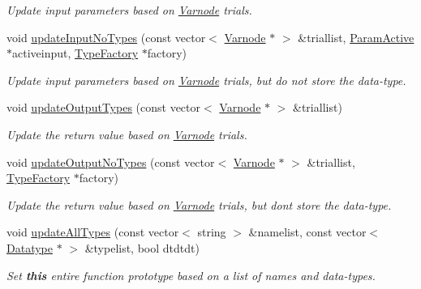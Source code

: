 \begin{DoxyCompactItemize}
\begin{DoxyCompactList}\small\item\em Update input parameters based on \mbox{\hyperlink{class_varnode}{Varnode}} trials. \end{DoxyCompactList}\item 
void \mbox{\hyperlink{class_func_proto_ad2b6986a4cf61f042579472e394ad7f8}{update\+Input\+No\+Types}} (const vector$<$ \mbox{\hyperlink{class_varnode}{Varnode}} $\ast$ $>$ \&triallist, \mbox{\hyperlink{class_param_active}{Param\+Active}} $\ast$activeinput, \mbox{\hyperlink{class_type_factory}{Type\+Factory}} $\ast$factory)
\begin{DoxyCompactList}\small\item\em Update input parameters based on \mbox{\hyperlink{class_varnode}{Varnode}} trials, but do not store the data-\/type. \end{DoxyCompactList}\item 
void \mbox{\hyperlink{class_func_proto_a56cbde2e23cdcf41ddb870721e02be6b}{update\+Output\+Types}} (const vector$<$ \mbox{\hyperlink{class_varnode}{Varnode}} $\ast$ $>$ \&triallist)
\begin{DoxyCompactList}\small\item\em Update the return value based on \mbox{\hyperlink{class_varnode}{Varnode}} trials. \end{DoxyCompactList}\item 
void \mbox{\hyperlink{class_func_proto_a882e34d08f3e4e44ba5aa25b87c84bfe}{update\+Output\+No\+Types}} (const vector$<$ \mbox{\hyperlink{class_varnode}{Varnode}} $\ast$ $>$ \&triallist, \mbox{\hyperlink{class_type_factory}{Type\+Factory}} $\ast$factory)
\begin{DoxyCompactList}\small\item\em Update the return value based on \mbox{\hyperlink{class_varnode}{Varnode}} trials, but don\textquotesingle{}t store the data-\/type. \end{DoxyCompactList}\item 
void \mbox{\hyperlink{class_func_proto_a9ad6aba5f6731281a4c16fdfac76de2c}{update\+All\+Types}} (const vector$<$ string $>$ \&namelist, const vector$<$ \mbox{\hyperlink{class_datatype}{Datatype}} $\ast$ $>$ \&typelist, bool dtdtdt)
\begin{DoxyCompactList}\small\item\em Set {\bfseries{this}} entire function prototype based on a list of names and data-\/types. \end{DoxyCompactList}\item 

\end{DoxyCompactItemize}

